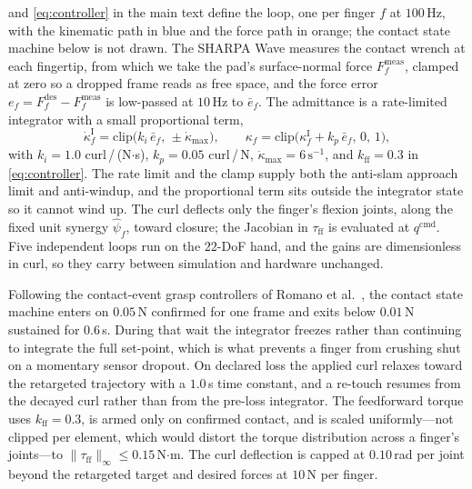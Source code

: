   and \cref{eq:controller} in the main text define the loop, one per finger $f$ at $100$\,Hz, with the kinematic path in blue and the force path in orange; the contact state machine below is not drawn. The SHARPA Wave measures the contact wrench at each fingertip, from which we take the pad's surface-normal force $F^{\mathrm{meas}}_f$, clamped at zero so a dropped frame reads as free space, and the force error $e_f = F^{\mathrm{des}}_f - F^{\mathrm{meas}}_f$ is low-passed at $10$\,Hz to $\bar{e}_f$. The admittance is a rate-limited integrator with a small proportional term,
\begin{equation}
\label{eq:admittance}
\dot{\kappa}^{\mathrm{I}}_f = \mathrm{clip}\big(k_i\,\bar{e}_f,\, \pm\dot{\kappa}_{\max}\big), \qquad
\kappa_f = \mathrm{clip}\big(\kappa^{\mathrm{I}}_f + k_p\,\bar{e}_f,\, 0,\, 1\big),
\end{equation}
with $k_i = 1.0$ curl\,/\,(N$\cdot$s), $k_p = 0.05$ curl\,/\,N, $\dot{\kappa}_{\max} = 6\,\mathrm{s}^{-1}$, and $k_{\mathrm{ff}} = 0.3$ in \cref{eq:controller}. The rate limit and the clamp supply both the anti-slam approach limit and anti-windup, and the proportional term sits outside the integrator state so it cannot wind up. The curl deflects only the finger's flexion joints, along the fixed unit synergy $\hat{\psi}_f$, toward closure; the Jacobian in $\tau_{\mathrm{ff}}$ is evaluated at $q^{\mathrm{cmd}}$. Five independent loops run on the $22$-DoF hand, and the gains are dimensionless in curl, so they carry between simulation and hardware unchanged.

 Following the contact-event grasp controllers of Romano et al.~\citep{romano2011}, the contact state machine enters on $0.05$\,N confirmed for one frame and exits below $0.01$\,N sustained for $0.6$\,s. During that wait the integrator freezes rather than continuing to integrate the full set-point, which is what prevents a finger from crushing shut on a momentary sensor dropout. On declared loss the applied curl relaxes toward the retargeted trajectory with a $1.0$\,s time constant, and a re-touch resumes from the decayed curl rather than from the pre-loss integrator. The feedforward torque uses $k_{\mathrm{ff}} = 0.3$, is armed only on confirmed contact, and is scaled uniformly---not clipped per element, which would distort the torque distribution across a finger's joints---to $\lVert\tau_{\mathrm{ff}}\rVert_\infty \le 0.15$\,N$\cdot$m. The curl deflection is capped at $0.10$\,rad per joint beyond the retargeted target and desired forces at $10$\,N per finger.

